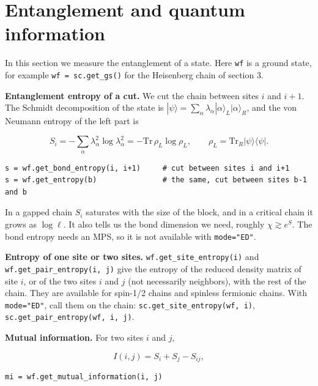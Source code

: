 \documentclass[11pt]{article}
\begin{document}
\section{Entanglement and quantum information}

In this section we measure the entanglement of a state. Here \texttt{wf} is a
ground state, for example \texttt{wf\ =\ sc.\allowbreak{}get\_\allowbreak{}gs()} for the Heisenberg chain of
section 3.

\textbf{Entanglement entropy of a cut.} We cut the chain between sites \(i\) and
\(i+1\). The Schmidt decomposition of the state is
\(|\psi\rangle=\sum_\alpha\lambda_\alpha|\alpha\rangle_L|\alpha\rangle_R\),
and the von Neumann entropy of the left part is

\[S_i=-\sum_\alpha\lambda_\alpha^2\log\lambda_\alpha^2
=-\mathrm{Tr}\,\rho_L\log\rho_L,\qquad
\rho_L=\mathrm{Tr}_R|\psi\rangle\langle\psi|.\]

\begin{lstlisting}
s = wf.get_bond_entropy(i, i+1)     # cut between sites i and i+1
s = wf.get_entropy(b)               # the same, cut between sites b-1 and b
\end{lstlisting}

In a gapped chain \(S_i\) saturates with the size of the block, and in a
critical chain it grows as \(\log\ell\). It also tells us the bond dimension
we need, roughly \(\chi\gtrsim e^{S}\). The bond entropy needs an MPS, so it
is not available with \texttt{mode="ED"}.

\textbf{Entropy of one site or two sites.} \texttt{wf.\allowbreak{}get\_\allowbreak{}site\_\allowbreak{}entropy(i)} and
\texttt{wf.\allowbreak{}get\_\allowbreak{}pair\_\allowbreak{}entropy(i,\ j)} give the entropy of the reduced density matrix
of site \(i\), or of the two sites \(i\) and \(j\) (not necessarily neighbors),
with the rest of the chain. They are available for spin-1/2 chains and
spinless fermionic chains. With \texttt{mode="ED"}, call them on the chain:
\texttt{sc.\allowbreak{}get\_\allowbreak{}site\_\allowbreak{}entropy(wf,\ i)}, \texttt{sc.\allowbreak{}get\_\allowbreak{}pair\_\allowbreak{}entropy(wf,\ i,\ j)}.

\textbf{Mutual information.} For two sites \(i\) and \(j\),

\[I(i,j)=S_i+S_j-S_{ij},\]

\begin{lstlisting}
mi = wf.get_mutual_information(i, j)
\end{lstlisting}
\end{document}
